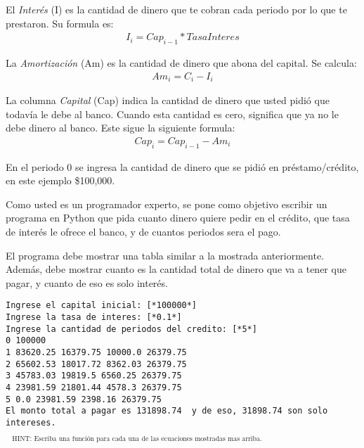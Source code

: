 El \textit{Interés} (I) es la cantidad de dinero que te cobran cada periodo por lo que te prestaron. Su formula es:
\begin{align*}
    I_i = Cap_{i-1} * TasaInteres
\end{align*}

La \textit{Amortización} (Am) es la cantidad de dinero que abona del capital. Se calcula:
\begin{align*}
    Am_i = C_i - I_i
\end{align*}


La columna \textit{Capital} (Cap) indica la cantidad de dinero que usted pidió que todavía le debe al banco. Cuando esta cantidad es cero, significa que ya no le debe dinero al banco. Este sigue la siguiente formula:
\begin{align*}
    Cap_i = Cap_{i-1} - Am_i
\end{align*}


En el periodo 0 se ingresa la cantidad de dinero que se pidió en préstamo/crédito, en este ejemplo \$100,000.

Como usted es un programador experto, se pone como objetivo escribir un programa en Python que pida cuanto dinero quiere pedir en el crédito, que tasa de interés le ofrece el banco, y de cuantos periodos sera el pago. 

El programa debe mostrar una tabla similar a la mostrada anteriormente. Además, debe mostrar cuanto es la cantidad total de dinero que va a tener que pagar, y cuanto de eso es solo interés.

\begin{lstlisting}[style=consola]
Ingrese el capital inicial: [*100000*]
Ingrese la tasa de interes: [*0.1*]
Ingrese la cantidad de periodos del credito: [*5*]
0 100000
1 83620.25 16379.75 10000.0 26379.75
2 65602.53 18017.72 8362.03 26379.75
3 45783.03 19819.5 6560.25 26379.75
4 23981.59 21801.44 4578.3 26379.75
5 0.0 23981.59 2398.16 26379.75
El monto total a pagar es 131898.74  y de eso, 31898.74 son solo intereses.
\end{lstlisting}

$\text{ }_{\text{HINT:  Escriba una función para cada una de las ecuaciones mostradas mas arriba.}}$
